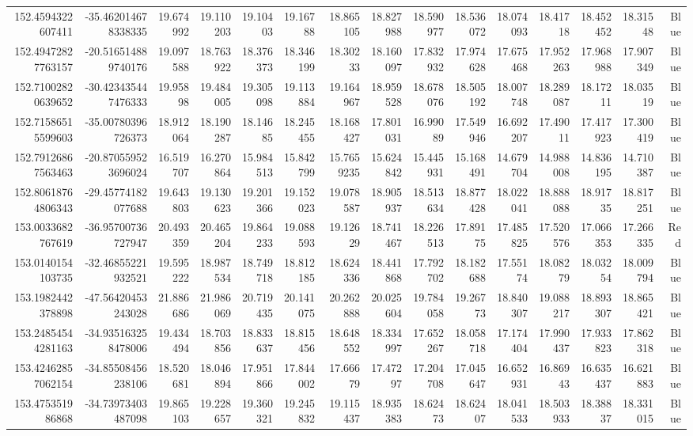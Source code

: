\begin{center}
\begin{longtable}{rrrrrrrrrrrrrrr}
152.4594322607411 & -35.462014678338335 & 19.674992 & 19.110203 & 19.10403 & 19.16788 & 18.865105 & 18.827988 & 18.590977 & 18.536072 & 18.074093 & 18.41718 & 18.452452 & 18.31548 & Blue \\
152.49472827763157 & -20.516514889740176 & 19.097588 & 18.763922 & 18.376373 & 18.346199 & 18.30233 & 18.160097 & 17.832932 & 17.974628 & 17.675468 & 17.952263 & 17.968988 & 17.907349 & Blue \\
152.71002820639652 & -30.423435447476333 & 19.95898 & 19.484005 & 19.305098 & 19.113884 & 19.164967 & 18.959528 & 18.678076 & 18.505192 & 18.007748 & 18.289087 & 18.17211 & 18.03519 & Blue \\
152.71586515599603 & -35.00780396726373 & 18.912064 & 18.190287 & 18.14685 & 18.245455 & 18.168427 & 17.801031 & 16.99089 & 17.549946 & 16.692207 & 17.49011 & 17.417923 & 17.300419 & Blue \\
152.79126867563463 & -20.870559523696024 & 16.519707 & 16.270864 & 15.984513 & 15.842799 & 15.7659235 & 15.624842 & 15.445931 & 15.168491 & 14.679704 & 14.988008 & 14.836195 & 14.710387 & Blue \\
152.80618764806343 & -29.45774182077688 & 19.643803 & 19.130623 & 19.201366 & 19.152023 & 19.078587 & 18.905937 & 18.513634 & 18.877428 & 18.022041 & 18.888088 & 18.91735 & 18.817251 & Blue \\
153.0033682767619 & -36.95700736727947 & 20.493359 & 20.465204 & 19.864233 & 19.088593 & 19.12629 & 18.741467 & 18.226513 & 17.89175 & 17.485825 & 17.520576 & 17.066353 & 17.266335 & Red \\
153.0140154103735 & -32.46855221932521 & 19.595222 & 18.987534 & 18.749718 & 18.812185 & 18.624336 & 18.441868 & 17.792702 & 18.182688 & 17.55174 & 18.08279 & 18.03254 & 18.009794 & Blue \\
153.1982442378898 & -47.56420453243028 & 21.886686 & 21.986069 & 20.719435 & 20.141075 & 20.262888 & 20.025604 & 19.784058 & 19.26773 & 18.840307 & 19.088217 & 18.893307 & 18.865421 & Blue \\
153.24854544281163 & -34.935163258478006 & 19.434494 & 18.703856 & 18.833637 & 18.815456 & 18.648552 & 18.334997 & 17.652267 & 18.058718 & 17.174404 & 17.990437 & 17.933823 & 17.862318 & Blue \\
153.42462857062154 & -34.85508456238106 & 18.520681 & 18.046894 & 17.951866 & 17.844002 & 17.66679 & 17.47297 & 17.204708 & 17.045647 & 16.652931 & 16.86943 & 16.635437 & 16.621883 & Blue \\
153.475351986868 & -34.73973403487098 & 19.865103 & 19.228657 & 19.360321 & 19.245832 & 19.115437 & 18.935383 & 18.62473 & 18.62407 & 18.041533 & 18.503933 & 18.38837 & 18.331015 & Blue \\

\end{longtable}
\end{center}
